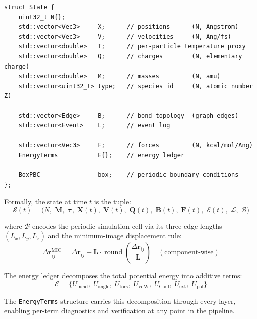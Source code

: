 \documentclass[11pt,twoside]{article}
\newcommand{\type}[1]{\texttt{#1}}
\begin{document}
\begin{lstlisting}
struct State {
    uint32_t N{};
    std::vector<Vec3>     X;      // positions      (N, Angstrom)
    std::vector<Vec3>     V;      // velocities     (N, Ang/fs)
    std::vector<double>   T;      // per-particle temperature proxy
    std::vector<double>   Q;      // charges        (N, elementary charge)
    std::vector<double>   M;      // masses         (N, amu)
    std::vector<uint32_t> type;   // species id     (N, atomic number Z)

    std::vector<Edge>     B;      // bond topology  (graph edges)
    std::vector<Event>    L;      // event log

    std::vector<Vec3>     F;      // forces         (N, kcal/mol/Ang)
    EnergyTerms           E{};    // energy ledger

    BoxPBC                box;    // periodic boundary conditions
};
\end{lstlisting}

Formally, the state at time $t$ is the tuple:
\begin{equation}
  \mathcal{S}(t) = \bigl(N,\; \mathbf{M},\; \boldsymbol{\tau},\;
                         \mathbf{X}(t),\; \mathbf{V}(t),\; \mathbf{Q}(t),\;
                         \mathbf{B}(t),\; \mathbf{F}(t),\; \mathcal{E}(t),\;
                         \mathcal{L},\; \mathcal{B}\bigr)
  \label{eq:state-tuple}
\end{equation}

where $\mathcal{B}$ encodes the periodic simulation cell via its three edge lengths $(L_x, L_y, L_z)$ and the minimum-image displacement rule:
\begin{equation}
  \Delta\mathbf{r}_{ij}^{\text{MIC}}
    = \Delta\mathbf{r}_{ij}
    - \mathbf{L} \cdot \operatorname{round}\!\left(
        \frac{\Delta\mathbf{r}_{ij}}{\mathbf{L}}\right)
  \quad (\text{component-wise})
  \label{eq:mic}
\end{equation}

The energy ledger decomposes the total potential energy into additive terms:
\begin{equation}
  \mathcal{E} = \{U_{\mathrm{bond}},\; U_{\mathrm{angle}},\; U_{\mathrm{tors}},\;
                  U_{\mathrm{vdW}},\; U_{\mathrm{Coul}},\; U_{\mathrm{ext}},\;
                  U_{\mathrm{pol}}\}
  \label{eq:ledger}
\end{equation}

The \type{EnergyTerms} structure carries this decomposition through every layer, enabling per-term diagnostics and verification at any point in the pipeline.
\end{document}
